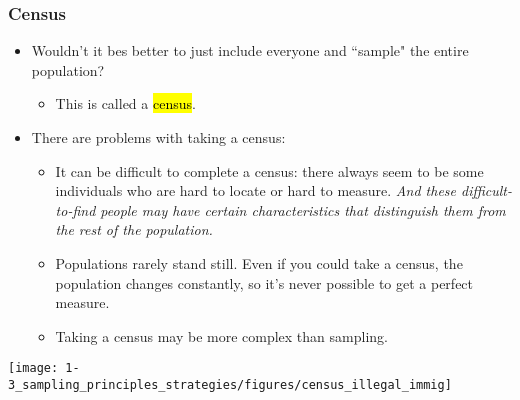 \begin{frame}
\frametitle{Census}

\begin{itemize}

\item Wouldn't it bes better to just include everyone and ``sample" the entire population? 

\begin{itemize}
\item This is called a \hl{census}.
\end{itemize}

\pause

\item There are problems with taking a census:

\begin{itemize}
\item It can be difficult to complete a census: there always seem to be some individuals who are hard to locate or hard to measure. \textit{And these difficult-to-find people may have certain characteristics that distinguish them from the rest of the population.}
\item Populations rarely stand still. Even if you could take a census, the population changes constantly, so it's never possible to get a perfect measure.
\item Taking a census may be more complex than sampling.
\end{itemize}

\end{itemize}

\end{frame}


\begin{frame}

\vfill

\begin{center}
\texttt{[image: 1-3\_sampling\_principles\_strategies/figures/census\_illegal\_immig]}
\end{center}


\end{frame}


